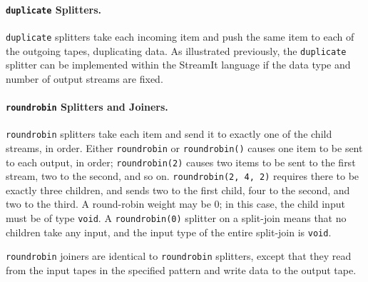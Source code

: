 \documentclass[11pt]{article}
\newcommand{\new}{\marginpar{\footnotesize \textbf{~~--~New~--}}}
\begin{document}


\paragraph{\lstinline|duplicate| Splitters.} \lstinline|duplicate| 
splitters take each incoming item and push the same item to each of
the outgoing tapes, duplicating data.  As illustrated previously, the
\lstinline|duplicate| splitter can be implemented within the StreamIt
language if the data type and number of output streams are fixed.

\paragraph{\lstinline|roundrobin| Splitters and Joiners.}  \lstinline|roundrobin| 
splitters take each item and send it to exactly one of the child
streams, in order.  Either \lstinline|roundrobin| or
\lstinline|roundrobin()| causes one item to be sent to each output, in
order; \lstinline|roundrobin(2)| causes two items to be sent to the
first stream, two to the second, and so on.  \lstinline|roundrobin(2, 4, 2)| 
requires there to be exactly three children, and sends two to
the first child, four to the second, and two to the third.  A
round-robin weight may be 0; in this case, the child input must be of
type \lstinline|void|.  A \lstinline|roundrobin(0)| splitter on a
split-join means that no children take any input, and the input type
of the entire split-join is \lstinline|void|.

\lstinline|roundrobin| joiners are identical to \lstinline|roundrobin|
splitters, except that they read from the input tapes in the specified
pattern and write data to the output tape.

\end{document}
